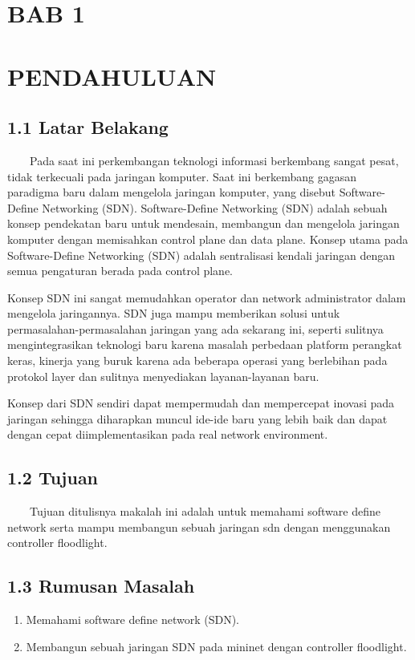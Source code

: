 \section{BAB 1}
\section{PENDAHULUAN}
\subsection{1.1 Latar Belakang}
\ \ \ \ Pada saat ini perkembangan teknologi informasi berkembang sangat pesat, tidak terkecuali pada jaringan komputer.
Saat ini berkembang gagasan paradigma baru dalam mengelola jaringan komputer, yang disebut Software-Define Networking
(SDN). Software-Define Networking (SDN) adalah sebuah konsep pendekatan baru untuk mendesain, membangun dan mengelola
jaringan komputer dengan memisahkan control plane dan data plane. Konsep utama pada Software-Define Networking (SDN)
adalah sentralisasi kendali jaringan dengan semua pengaturan berada pada control plane.

Konsep SDN ini sangat memudahkan operator dan network administrator dalam mengelola jaringannya. SDN juga mampu
memberikan solusi untuk permasalahan-permasalahan jaringan yang ada sekarang ini, seperti sulitnya mengintegrasikan
teknologi baru karena masalah perbedaan platform perangkat keras, kinerja yang buruk karena ada beberapa operasi yang
berlebihan pada protokol layer dan sulitnya menyediakan layanan-layanan baru.

Konsep dari SDN sendiri dapat mempermudah dan mempercepat inovasi pada jaringan sehingga diharapkan muncul ide-ide
baru yang lebih baik dan dapat dengan cepat diimplementasikan pada real network environment. 

\subsection{1.2 Tujuan}
\ \ \ \ Tujuan ditulisnya makalah ini adalah untuk memahami software define network serta mampu membangun sebuah jaringan
sdn dengan menggunakan controller floodlight.

\subsection{1.3 Rumusan Masalah}
\liststyleLi
\begin{enumerate}
\item Memahami software define network (SDN).
\item Membangun sebuah jaringan SDN pada mininet dengan controller floodlight.
\end{enumerate}
